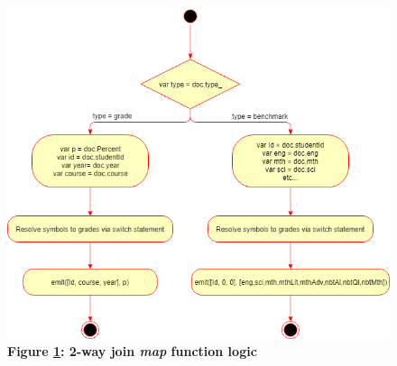\begin{figure}[H]
    \centering
    \begin{mdframed}
        \centering
        \includegraphics[scale=0.59]{./resources/figures/2-way-join-map.png}
    \end{mdframed}
    \caption[2-Way Join Map Function]{\textbf{Figure \ref{fig-2-way-join-map-function}: 2-way join \textit{map} function logic}}
    \label{fig-2-way-join-map-function}
\end{figure}
